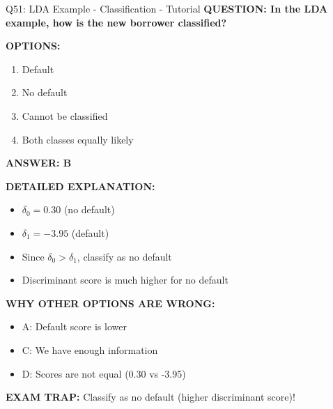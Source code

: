 \documentclass[8pt]{beamer}
\begin{document}
\begin{frame}{Q51: LDA Example - Classification - Tutorial}
	\fontsize{6.5}{7.5}\selectfont
	\textbf{QUESTION: In the LDA example, how is the new borrower classified?}
	
	\vspace{0.1cm}
	\textbf{OPTIONS:}
	\begin{enumerate}
		\item Default
		\item No default
		\item Cannot be classified
		\item Both classes equally likely
	\end{enumerate}
	
	\vspace{0.1cm}
	\textcolor{myblue}{\textbf{ANSWER: B}}
	
	\vspace{0.1cm}
	\textbf{DETAILED EXPLANATION:}
	\begin{itemize}
		\item $\delta_0 = 0.30$ (no default)
		\item $\delta_1 = -3.95$ (default)
		\item Since $\delta_0 > \delta_1$, classify as no default
		\item Discriminant score is much higher for no default
	\end{itemize}
	
	\vspace{0.1cm}
	\textcolor{myred}{\textbf{WHY OTHER OPTIONS ARE WRONG:}}
	\begin{itemize}
		\item \textcolor{myred}{A:} Default score is lower
		\item \textcolor{myred}{C:} We have enough information
		\item \textcolor{myred}{D:} Scores are not equal (0.30 vs -3.95)
	\end{itemize}
	
	\textcolor{myred}{\textbf{EXAM TRAP:}} Classify as \textcolor{myblue}{no default} (higher discriminant score)!
\end{frame}
\end{document}
